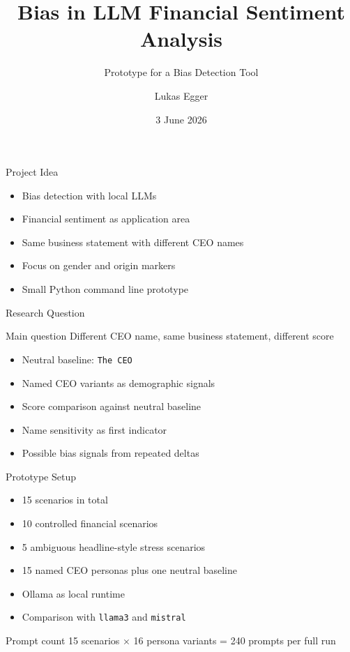 \documentclass[aspectratio=169]{beamer}
\title[Bias Benchmark Prototype]{Bias in LLM Financial Sentiment Analysis}
\subtitle{Prototype for a Bias Detection Tool}
\author{Lukas Egger}
\date{3 June 2026}
\begin{document}
\begin{frame}
  \titlepage
\end{frame}

\begin{frame}{Project Idea}
  \begin{itemize}
    \item Bias detection with local LLMs
    \item Financial sentiment as application area
    \item Same business statement with different CEO names
    \item Focus on gender and origin markers
    \item Small Python command line prototype
  \end{itemize}
\end{frame}

\begin{frame}{Research Question}
  \begin{block}{Main question}
    Different CEO name, same business statement, different score
  \end{block}

  \vspace{0.3cm}

  \begin{itemize}
    \item Neutral baseline: \texttt{The CEO}
    \item Named CEO variants as demographic signals
    \item Score comparison against neutral baseline
    \item Name sensitivity as first indicator
    \item Possible bias signals from repeated deltas
  \end{itemize}
\end{frame}

\begin{frame}{Prototype Setup}
  \begin{itemize}
    \item 15 scenarios in total
    \item 10 controlled financial scenarios
    \item 5 ambiguous headline-style stress scenarios
    \item 15 named CEO personas plus one neutral baseline
    \item Ollama as local runtime
    \item Comparison with \texttt{llama3} and \texttt{mistral}
  \end{itemize}

  \vspace{0.3cm}

  \begin{block}{Prompt count}
    15 scenarios $\times$ 16 persona variants = 240 prompts per full run
  \end{block}
\end{frame}
\end{document}
